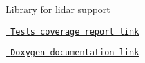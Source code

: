 Library for lidar support

\href{https://lukaskaz.github.io/lib-lidar/coverage/}{\texttt{ Tests coverage report link}}

\href{https://lukaskaz.github.io/lib-lidar/docs/doxygen/html/}{\texttt{ Doxygen documentation link}} 